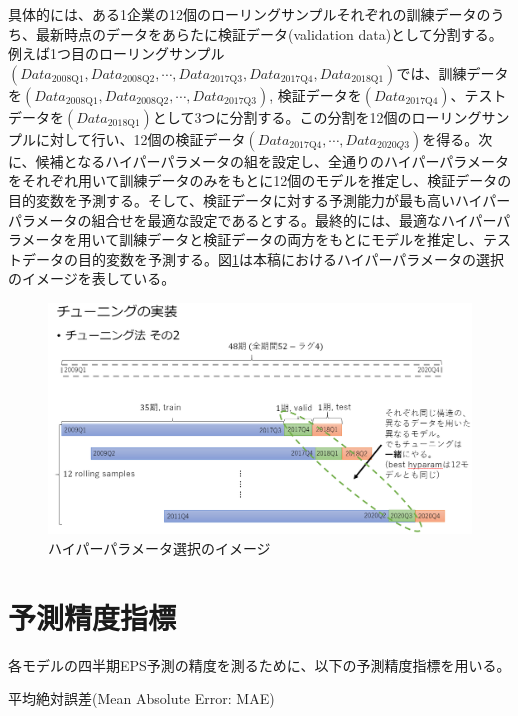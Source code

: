 \documentclass[a4paper, 12pt]{jsarticle}
\begin{document}
具体的には、ある1企業の12個のローリングサンプルそれぞれの訓練データのうち、最新時点のデータをあらたに検証データ(validation data)として分割する。例えば1つ目のローリングサンプル$(Data_{\text{2008Q1}}, Data_{\text{2008Q2}}, \cdots, Data_{\text{2017Q3}}, Data_{\text{2017Q4}}, Data_{\text{2018Q1}})$では、訓練データを$(Data_{\text{2008Q1}}, Data_{\text{2008Q2}}, \cdots, Data_{\text{2017Q3}})$, 検証データを$(Data_{\text{2017Q4}})$、テストデータを$(Data_{\text{2018Q1}})$として3つに分割する。この分割を12個のローリングサンプルに対して行い、12個の検証データ$(Data_{\text{2017Q4}}, \cdots , Data_{2020Q3})$を得る。次に、候補となるハイパーパラメータの組を設定し、全通りのハイパーパラメータをそれぞれ用いて訓練データのみをもとに12個のモデルを推定し、検証データの目的変数を予測する。そして、検証データに対する予測能力が最も高いハイパーパラメータの組合せを最適な設定であるとする。最終的には、最適なハイパーパラメータを用いて訓練データと検証データの両方をもとにモデルを推定し、テストデータの目的変数を予測する。図\ref{fig:hyparam_selection}は本稿におけるハイパーパラメータの選択のイメージを表している。


\begin{figure}
  \centering
  \caption{ハイパーパラメータ選択のイメージ}
  \label{fig:hyparam_selection}
  \includegraphics[width=12cm]{./img/_rolling_sample_val_i.png}
\end{figure}

\part{予測精度指標}

各モデルの四半期EPS予測の精度を測るために、以下の予測精度指標を用いる。

平均絶対誤差(Mean Absolute Error: MAE)
\end{document}
